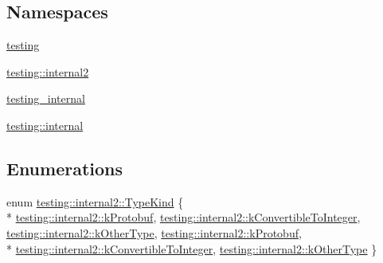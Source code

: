 \subsection*{Namespaces}
\begin{DoxyCompactItemize}
\item 
\hyperlink{namespacetesting}{testing}
\item 
\hyperlink{namespacetesting_1_1internal2}{testing\-::internal2}
\item 
\hyperlink{namespacetesting__internal}{testing\-\_\-internal}
\item 
\hyperlink{namespacetesting_1_1internal}{testing\-::internal}
\end{DoxyCompactItemize}
\subsection*{Enumerations}
\begin{DoxyCompactItemize}
\item 
enum \hyperlink{namespacetesting_1_1internal2_aeb8161b0b3ee503347b0662d7028fd57}{testing\-::internal2\-::\-Type\-Kind} \{ \\*
\hyperlink{namespacetesting_1_1internal2_aeb8161b0b3ee503347b0662d7028fd57ab6c394f7612d98d3a4a0514b2d6eb840}{testing\-::internal2\-::k\-Protobuf}, 
\hyperlink{namespacetesting_1_1internal2_aeb8161b0b3ee503347b0662d7028fd57a17045378f0cb6cac7737d414d39c720e}{testing\-::internal2\-::k\-Convertible\-To\-Integer}, 
\hyperlink{namespacetesting_1_1internal2_aeb8161b0b3ee503347b0662d7028fd57a36261578e764cf2fabfa058345c95016}{testing\-::internal2\-::k\-Other\-Type}, 
\hyperlink{namespacetesting_1_1internal2_aeb8161b0b3ee503347b0662d7028fd57ab6c394f7612d98d3a4a0514b2d6eb840}{testing\-::internal2\-::k\-Protobuf}, 
\\*
\hyperlink{namespacetesting_1_1internal2_aeb8161b0b3ee503347b0662d7028fd57a17045378f0cb6cac7737d414d39c720e}{testing\-::internal2\-::k\-Convertible\-To\-Integer}, 
\hyperlink{namespacetesting_1_1internal2_aeb8161b0b3ee503347b0662d7028fd57a36261578e764cf2fabfa058345c95016}{testing\-::internal2\-::k\-Other\-Type}
 \}
\end{DoxyCompactItemize}
